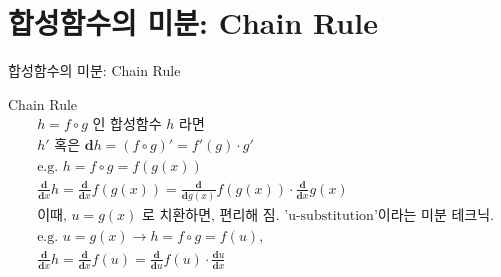\documentclass[aspectratio=169]{beamer}
\begin{document}
\section{합성함수의 미분: Chain Rule}


\begin{frame}{합성함수의 미분: Chain Rule}
  \begin{block}{Chain Rule}
    \begin{align*}
      & h = {f} \circ {g} \text{ 인 합성함수 } h \text{ 라면} \\
      & h' \text{ 혹은 } \mathbf{d} h  = ( {f} \circ {g} )' = {f'}({g}) \cdot {g'} \\[1em]
      & \text{e.g. } h = {f} \circ {g} = f(g(x)) \\
      & \frac{\mathbf{d}}{\mathbf{d}x} h = \frac{\mathbf{d}}{\mathbf{d}x} f(g(x)) = \frac{\mathbf{d}}{\mathbf{d}g(x)} f(g(x)) \cdot \frac{\mathbf{d}}{\mathbf{d}x} g(x) \\
      & \text{이때, } u = g(x) \text{ 로 치환하면, 편리해 짐. 'u-substitution'이라는 미분 테크닉.} \\
      & \text{e.g. } u = g(x) \rightarrow h = {f} \circ {g} = f(u), \quad  \\
      & \frac{\mathbf{d}}{\mathbf{d}x} h = \frac{\mathbf{d}}{\mathbf{d}x} f(u) = \frac{\mathbf{d}}{\mathbf{d}u} f(u) \cdot \frac{\mathbf{d}u}{\mathbf{d}x}  \\
    \end{align*}
  \end{block}
\end{frame}
\end{document}
